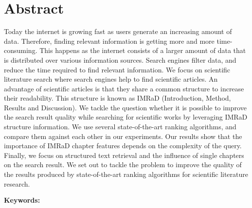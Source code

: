 \chapter*{Abstract}
\label{cha:abstract}

Today the internet is growing fast as users generate an increasing amount of data. Therefore, finding relevant information is getting more and more time-consuming. This happens as the internet consists of a larger amount of data that is distributed over various information sources. Search engines filter data, and reduce the time required to find relevant information. We focus on scientific literature search where search engines help to find scientific articles. An advantage of scientific articles is that they share a common structure to increase their readability. This structure is known as IMRaD (Introduction, Method, Results and Discussion). We tackle the question whether it is possible to improve the search result quality while searching for scientific works by leveraging IMRaD structure information. We use several state-of-the-art ranking algorithms, and compare them against each other in our experiments. Our results show that the importance of IMRaD chapter features depends on the complexity of the query. Finally, we focus on structured text retrieval and the influence of single chapters on the search result. We set out to tackle the problem to improve the quality of the results produced by state-of-the-art ranking algorithms for scientific literature research.



\textbf{Keywords:} \mykeywords{}